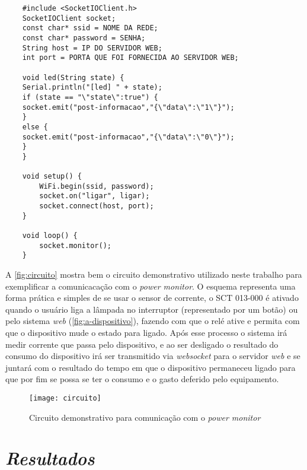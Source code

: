 \addtocounter{footnote}{-2}
\addtocounter{footnote}{1}
\addtocounter{footnote}{1}

\begin{lstlisting}
	#include <SocketIOClient.h>
	SocketIOClient socket;
	const char* ssid = NOME DA REDE;
	const char* password = SENHA;
	String host = IP DO SERVIDOR WEB;
	int port = PORTA QUE FOI FORNECIDA AO SERVIDOR WEB;	

	void led(String state) {
	Serial.println("[led] " + state);
	if (state == "\"state\":true") {
	socket.emit("post-informacao","{\"data\":\"1\"}");
	}
	else {
	socket.emit("post-informacao","{\"data\":\"0\"}");
	}
	}

	void setup() {
		WiFi.begin(ssid, password);
  		socket.on("ligar", ligar);  
  		socket.connect(host, port);
	}

	void loop() {
  		socket.monitor();    
	}
\end{lstlisting}

A \autoref{fig:circuito} mostra bem o circuito demonstrativo utilizado neste trabalho para exemplificar a comunicacação com o \textit{power monitor}.
O esquema representa uma forma prática e simples de se usar o sensor de corrente, o SCT 013-000 é ativado quando o usuário liga a lâmpada no interruptor
(representado por um botão) ou pelo sistema \textit{web} (\autoref{fig:a-dispositivo}), fazendo com que o relé ative e permita com que o dispositivo 
mude o estado para ligado. Após esse processo o sistema irá medir corrente que passa pelo dispositivo, e ao ser desligado o resultado
do consumo do dispositivo irá ser transmitido via \textit{websocket} para o servidor \textit{web} e se juntará com o resultado do tempo em que o dispositivo permaneceu
ligado para que por fim se possa se ter o consumo e o gasto deferido pelo equipamento. 

\begin{figure}[h!]
	\texttt{[image: circuito]}
	\centering
	\caption[Circuito demonstrativo para comunicação com o \textit{power monitor}]{Circuito demonstrativo para comunicação com o \textit{power monitor}}
	\label{fig:circuito}  
\end{figure}
\FloatBarrier

\section[\textit{Resultados}]{\textit{Resultados}}\label{resultados-sec}

